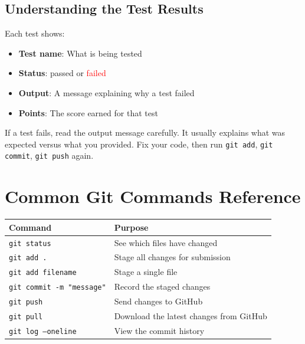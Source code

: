 \documentclass[
    a4paper,
    11pt,
    parskip=half
]{scrartcl}
\begin{document}
\subsection{Understanding the Test Results}

Each test shows:
\begin{itemize}
    \item \textbf{Test name}: What is being tested
    \item \textbf{Status}: \textcolor{green!50!black}{passed} or \textcolor{red}{failed}
    \item \textbf{Output}: A message explaining why a test failed
    \item \textbf{Points}: The score earned for that test
\end{itemize}

\begin{tipbox}
If a test fails, read the output message carefully. It usually explains what was expected versus what you provided. Fix your code, then run \texttt{git add}, \texttt{git commit}, \texttt{git push} again.
\end{tipbox}

\section{Common Git Commands Reference}
\label{sec:git-reference}

\begin{center}
\begin{tabular}{ll}
\hline
\textbf{Command} & \textbf{Purpose} \\
\hline
\texttt{git status} & See which files have changed \\
\texttt{git add .} & Stage all changes for submission \\
\texttt{git add filename} & Stage a single file \\
\texttt{git commit -m "message"} & Record the staged changes \\
\texttt{git push} & Send changes to GitHub \\
\texttt{git pull} & Download the latest changes from GitHub \\
\texttt{git log --oneline} & View the commit history \\
\hline
\end{tabular}
\end{center}

\end{document}
